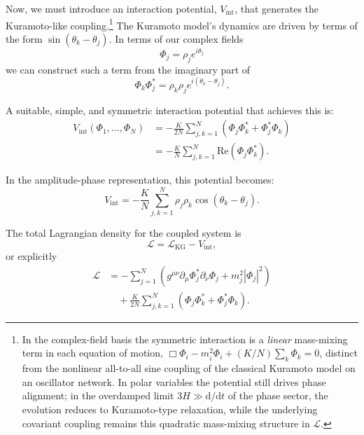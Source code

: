 Now, we must introduce an interaction potential, $V_{\text{int}}$, that generates the Kuramoto-like coupling.\footnote{In the complex-field basis the symmetric interaction is a \emph{linear} mass-mixing term in each equation of motion, $\Box\Phi_i - m_i^2\Phi_i + (K/N)\sum_k\Phi_k=0$, distinct from the nonlinear all-to-all sine coupling of the classical Kuramoto model on an oscillator network. In polar variables the potential still drives phase alignment; in the overdamped limit $3H \gg \mathrm{d}/\mathrm{d}t$ of the phase sector, the evolution reduces to Kuramoto-type relaxation, while the underlying covariant coupling remains this quadratic mass-mixing structure in $\mathcal{L}$.}
The Kuramoto model's dynamics are driven by terms of the form $\sin(\theta_k - \theta_j)$. In terms of our complex fields
\begin{equation}
\Phi_j = \rho_j e^{i\theta_j}
\end{equation}
we can construct such a term from the imaginary part of
\begin{equation}
\Phi_k \Phi_j^* = \rho_k \rho_j e^{i(\theta_k - \theta_j)} .
\end{equation}

A suitable, simple, and symmetric interaction potential that achieves this is:
\begin{equation}
    \begin{aligned}
        V_{\text{int}}(\Phi_1, \dots, \Phi_N)
        &= -\frac{K}{2N} \sum_{j,k=1}^N (\Phi_j \Phi_k^* + \Phi_j^* \Phi_k) \\
        &= -\frac{K}{N} \sum_{j,k=1}^N \text{Re}(\Phi_j \Phi_k^*) .
    \end{aligned}
\end{equation}

In the amplitude-phase representation, this potential becomes:
\begin{equation}
    V_{\text{int}} = -\frac{K}{N} \sum_{j,k=1}^N \rho_j \rho_k \cos(\theta_k - \theta_j) .
\end{equation}

The total Lagrangian density for the coupled system is
\begin{equation}
\mathcal{L} = \mathcal{L}_{\text{KG}} - V_{\text{int}} ,
\end{equation}
or explicitly
\begin{equation}
    \begin{aligned}
        \mathcal{L} &= -\sum_{j=1}^N \left( g^{\mu\nu} \partial_\mu \Phi_j^* \partial_\nu \Phi_j + m_j^2 |\Phi_j|^2 \right) \\
        &\quad + \frac{K}{2N} \sum_{j,k=1}^N (\Phi_j \Phi_k^* + \Phi_j^* \Phi_k) .
    \end{aligned}
\end{equation}

